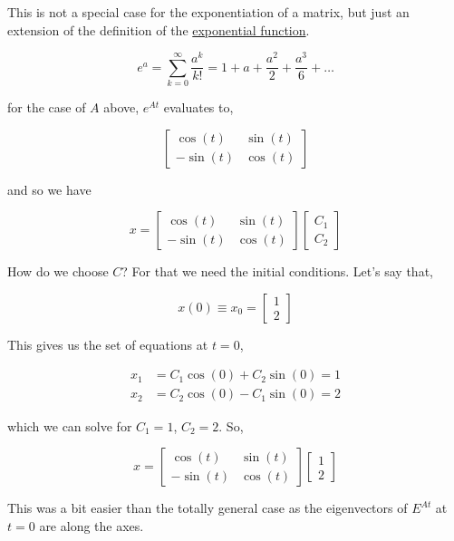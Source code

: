 \documentclass{article}
\begin{document}
\noindent This is not a special case for the exponentiation of a matrix, but just an extension of the definition of the \href{https://en.wikipedia.org/wiki/Exponential_function#Formal_definition}{exponential function}.

\begin{equation}
    e^a = \sum_{k=0}^{\infty} \frac{a^k}{k!} = 1 + a + \frac{a^2}{2} + \frac{a^3}{6} + \ldots{}
\end{equation}

\noindent for the case of $A$ above, $e^{At}$ evaluates to,

\begin{equation}
    \begin{bmatrix}
        \cos(t) & \sin(t) \\
        -\sin(t) & \cos(t)
    \end{bmatrix}
\end{equation}

\noindent and so we have

\begin{equation}
    x = \begin{bmatrix}
        \cos(t) & \sin(t) \\
        -\sin(t) & \cos(t)
    \end{bmatrix}
    \begin{bmatrix}
        C_1 \\
        C_2
    \end{bmatrix}
\end{equation}

\noindent How do we choose $C$? For that we need the initial conditions. Let's say that,

\begin{equation}
x(0) \equiv x_0 =
    \begin{bmatrix}
        1 \\
        2
    \end{bmatrix}
\end{equation}

\noindent This gives us the set of equations at $t = 0$,

\begin{align}
    x_1 &= C_1 \cos(0) + C_2 \sin(0) = 1 \\
    x_2 &= C_2 \cos(0) - C_1 \sin(0) = 2
\end{align}

\noindent which we can solve for $C_1 = 1$, $C_2 = 2$. So,

\begin{equation}
    x = \begin{bmatrix}
        \cos(t) & \sin(t) \\
        -\sin(t) & \cos(t)
    \end{bmatrix}
    \begin{bmatrix}
        1 \\
        2
    \end{bmatrix}
\end{equation}

\noindent This was a bit easier than the totally general case as the eigenvectors of $E^{At}$ at $t = 0$ are along the axes.
\end{document}
